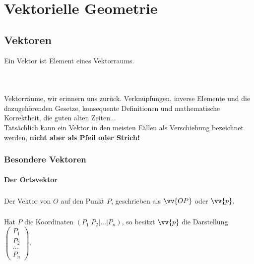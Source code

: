 \chapter{Vektorielle Geometrie}
\section{Vektoren}

    \begin{Definition}
        Ein Vektor ist Element eines Vektorraums.
    \end{Definition}\\
    \paragraph{} Vektorräume, wir erinnern uns zurück. Verknüpfungen, inverse Elemente und die dazugehörenden Gesetze, konsequente Definitionen und
    mathematische Korrektheit, die guten alten Zeiten...\\
    Tatsächlich kann ein Vektor in den meisten Fällen als Verschiebung bezeichnet werden, \textbf{nicht aber als Pfeil oder Strich!}\\


    \subsection{Besondere Vektoren}


        \subsubsection{Der Ortsvektor}

            \paragraph{} Der Vektor von $O$ auf den Punkt $P$, geschrieben als $\vv{OP}$ oder $\vv{p}$.\\
            \paragraph{} Hat $P$ die Koordinaten $(P_1|P_2|...|P_n)$, so besitzt $\vv{p}$ die Darstellung $\left(\begin{array}{c} P_1 \\ P_2 \\ ...\\P_n\end{array}\right)$.



